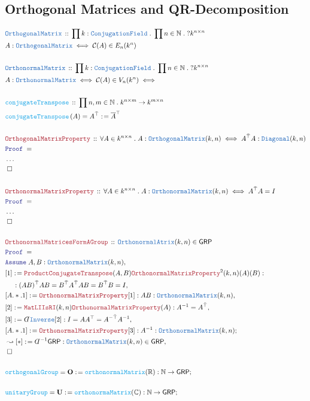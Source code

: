 \documentclass[12pt]{scrartcl}%
\newcommand{\TYPE}[1]{\textcolor{NavyBlue}{\mathtt{#1}}}%
\newcommand{\FUNC}[1]{\textcolor{Cerulean}{\mathtt{#1}}}%
\newcommand{\LOGIC}[1]{\textcolor{Blue}{\mathtt{#1}}}%
\newcommand{\THM}[1]{\textcolor{Maroon}{\mathtt{#1}}}%
\renewcommand{\.}{\; . \;} %
\newcommand{\de}{: \kern 0.1pc =} %
\newcommand{\Act}[1]{\left( #1 \right)} %
\newcommand{\Theorem}[2]{& \THM{#1} \, :: \, #2 \\ & \Proof = \\ } %
\newcommand{\DeclareType}[2]{& \TYPE{#1} \, :: \, #2 \\}%
\newcommand{\DefineType}[3]{& #1 : \TYPE{#2} \iff #3 \\}%
\newcommand{\DefineNamedType}[4]{& #1 : \TYPE{#2} \iff #3 \iff #4 \\}%
\newcommand{\DeclareFunc}[2]{& \FUNC{#1} \, :: \, #2 \\}%
\newcommand{\DefineNamedFunc}[4]{&  \FUNC{#1}\Act{#2} = #3 \de #4 \\}%
\newcommand{\NewLine}{\\ & \kern 1pc}%
\newcommand{\Page}[1]{ \begin{align*} #1 \end{align*}  }%
\newcommand{ \bd }{ \ByDef }%
\newcommand{\NoProof}{ & \ldots \\ \EndProof}%
\newcommand{\Reals}{\mathbb{R}}%
\newcommand{\Complex}{\mathbb{C}}%
\newcommand{\Nat}{\mathbb{N}}%
\newcommand{\Say}[3]{& #1 \de #2 : #3, \\} %
\newcommand{\Conclude}[3]{& #1 \de #2 : #3; \\}%
\newcommand{\Derive}[3]{& \leadsto #1 \de #2 : #3, \\} %
\newcommand{\Assume}[2]{& \LOGIC{Assume} \; #1 : #2, \\} %
\newcommand{\QED}{\; \square} %
\newcommand{\EndProof}{& \QED \\} %
\newcommand{\ByDef}{\rotatebox[origin=c]{-180}{$D$}}%
\newcommand{\Proof}{\LOGIC{Proof} \; } %
\newcommand{\C}{\mathcal{C}}
\newcommand{\GRP}{\mathsf{GRP}} %
\renewcommand{\O}{\mathbf{O}}
\newcommand{\U}{\mathbf{U}}
\begin{document}
\subsection{Orthogonal Matrices and QR-Decomposition}
\Page{
	\DeclareType{OrthogonalMatrix}{\prod k : \TYPE{ConjugationField} \. \prod n \in \Nat \. ? k^{n \times n}}
	\DefineType{A}{OrthogonalMatrix}{\C(A) \in E_n(k^n)}
	\\
	\DeclareType{OrthonormalMatrix}{ \prod k : \TYPE{ConjugationField} \. \prod n \in \Nat \.  ?k^{n \times n}}
	\DefineNamedType{A}{OrthonormalMatrix}{\C(A) \in V_n(k^n)}	
	\\
	\DeclareFunc{conjugateTranspose}{ \prod n,m \in \Nat \. k^{n \times m} \to k^{m \times n}}
	\DefineNamedFunc{conjugateTranspose}{A}{A^{\bar \top}}{\overline{A}^\top}
	\\
	\Theorem{OrthogonalMatrixProperty}{ \forall A \in k^{n \times n}  \. A : \TYPE{OrthogonalMatrix}(k,n) \iff A^{\bar \top} A : \TYPE{Diagonal}(k,n)  }
	\NoProof 
	\\
	\Theorem{OrthonormalMatrixProperty}{\forall A \in k^{n \times n} \. A : \TYPE{OrthonormalMatrix}(k,n) \iff A^{\bar \top} A = I}
	\NoProof
	\\
	\Theorem{OrthonormalMatricesFormAGroup}{ \TYPE{OrthonormalAtrix}(k,n) \in \GRP }
	\Assume{A,B}{\TYPE{OrthonormalMatrix}(k,n)}
	\Say{[1]}{ \THM{ProductConjugateTranspose}(A,B)\THM{OrthonormalMatrixProperty}^{2}(k,n)(A)(B)}
	{ \NewLine : (AB)^{\bar \top} AB = B^{\bar \top} A^{\bar \top} A B = B^{\bar \top} B = I}
	\Say{[A.*.1]}{ \THM{OrthonormalMatrixProperty}[1]}{AB : \TYPE{OrthonormalMatrix}(k,n)}
	\Say{[2]}{\THM{MatLIIsRI}(k,n)\THM{OrthonormalMatrixProperty}(A)}{A^{-1} = A^{\bar \top}}
	\Say{[3]}{\bd \TYPE{Inverse}[2]}{  I = A A^\top = A^{-\bar{\top}}A^{-1}  }
	\Conclude{[A.*.1]}{ \THM{OrthonormalMatrixProperty}[3]}{A^{-1} : \TYPE{OrthonormalMatrix}(k,n)}
	\Derive{[*]}{\bd^{-1}\GRP}{ \TYPE{OrthonormalMatrix}(k,n) \in \GRP} 
	\EndProof
	\\
	\Conclude{\FUNC{orthogonalGroup} = \O}{\FUNC{orthonormalMatrix}(\Reals)}{\Nat \to \GRP  }
	\\
	\Conclude{\FUNC{unitaryGroup} = \U}{\FUNC{orthonormaMatrix}(\Complex)}{\Nat \to \GRP}
}
\end{document}
